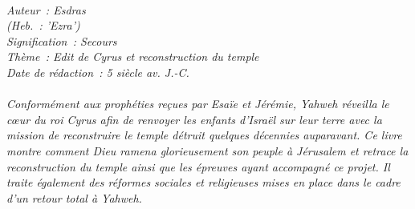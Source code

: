 \BFont
\noindent\hrulefill
{\footnotesize
\textit{
\bigskip
{\centering{}
\\Auteur~: Esdras
\\(Heb.~: 'Ezra')
\\Signification~: Secours
\\Thème~: Edit de Cyrus et reconstruction du temple
\\Date de rédaction~: 5 siècle av. J.-C.\\}
}
\textit{
\\Conformément aux prophéties reçues par Esaïe et Jérémie, Yahweh réveilla le cœur du roi Cyrus afin de renvoyer les enfants d'Israël sur leur terre avec la mission de reconstruire le temple détruit quelques décennies auparavant. Ce livre montre comment Dieu ramena glorieusement son peuple à Jérusalem et retrace la reconstruction du temple ainsi que les épreuves ayant accompagné ce projet. Il traite également des réformes sociales et religieuses mises en place dans le cadre d'un retour total à Yahweh.\bigskip
}
}
\par\nobreak\noindent\hrulefill
